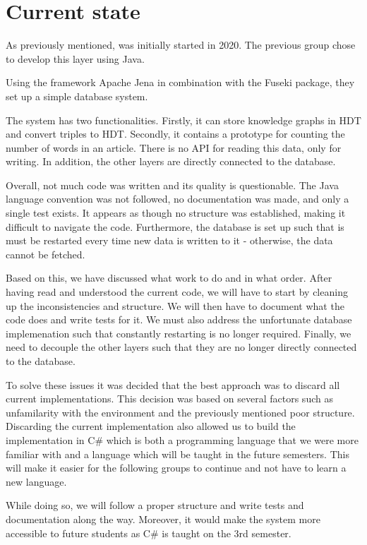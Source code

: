 \section{Current state}

As previously mentioned, \knox{} was initially started in 2020.
The previous group chose to develop this layer using Java.

Using the framework Apache Jena in combination with the Fuseki package, they set up a simple database system.

The system has two functionalities. 
Firstly, it can store knowledge graphs in HDT and convert triples to HDT.
Secondly, it contains a prototype for counting the number of words in an article.
There is no API for reading this data, only for writing. 
In addition, the other layers are directly connected to the database.

Overall, not much code was written and its quality is questionable. 
The Java language convention was not followed, no documentation was made, and only a single test exists. 
It appears as though no structure was established, making it difficult to navigate the code. 
Furthermore, the database is set up such that is must be restarted every time new data is written to it - otherwise, the data cannot be fetched.

Based on this, we have discussed what work to do and in what order.
After having read and understood the current code, we will have to start by cleaning up the inconsistencies and structure.
We will then have to document what the code does and write tests for it.
We must also address the unfortunate database implemenation such that constantly restarting is no longer required.
Finally, we need to decouple the other layers such that they are no longer directly connected to the database.

To solve these issues it was decided that the best approach was to discard all current implementations. This decision was based on several factors such as unfamilarity with the environment and the previously mentioned poor structure. Discarding the current implementation also allowed us to build the implementation in C# which is both a programming language that we were more familiar with and a language which will be taught in the future semesters. This will make it easier for the following groups to continue and not have to learn a new language.

While doing so, we will follow a proper structure and write tests and documentation along the way. 
Moreover, it would make the system more accessible to future students as C# is taught on the 3rd semester.  
